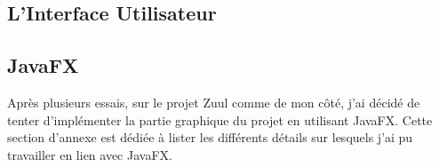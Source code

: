 \addappheadtotoc

\begin{appendix}
\chapter{L'Interface Utilisateur}

\section{JavaFX}

Après plusieurs essais, sur le projet Zuul comme de mon côté, j'ai décidé de tenter d'implémenter la partie graphique du projet en utilisant JavaFX. Cette section d'annexe est dédiée à lister les différents détails sur lesquels j'ai pu travailler en lien avec JavaFX.
\end{appendix}
